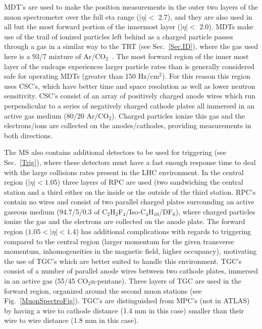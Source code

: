 \gls{MDT}'s are used to make the position measurements in the outer two layers of the muon spectrometer over the full eta range ($\mid\eta\mid<$ 2.7), and they are also used in all but the most forward portion of the innermost layer ($\mid\eta\mid<$ 2.0).  
MDTs make use of the trail of ionized particles left behind as a charged particle passes through a gas in a similar way to the TRT (see Sec.~\ref{Sec.ID}), where the gas used here is a 93/7 mixture of Ar/CO$_2$~\cite{JOIATLAS}.  
The most forward region of the inner most layer of the endcaps experiences larger particle rates than is generally considered safe for operating MDTs (greater than 150 Hz/cm$^2$).  
For this reason this region uses \gls{CSC}'s, which have better time and space resolution as well as lower neutron sensitivity.  
\gls{CSC}'s consist of an array of positively charged anode wires which run perpendicular to a series of negatively charged cathode plates all immersed in an active gas medium (80/20 Ar/CO$_2$).  
Charged particles ionize this gas and the electrons/ions are collected on the anodes/cathodes, providing measurements in both directions.  

The MS also contains additional detectors to be used for triggering (see Sec.~\ref{Trig}), where these detectors must have a fast enough response time to deal with the large collisions rates present in the LHC environment.  
In the central region ($\mid\eta\mid < 1.05$) three layers of \gls{RPC} are used (two sandwiching the central station and a third either on the inside or the outside of the third station.  
\gls{RPC}'s contain no wires and consist of two parallel charged plates surrounding an active gaseous medium (94.7/5/0.3 of C$_2$H$_2$F$_4$/Iso-C$_4$H$_10$/DF$_6$), where charged particles ionize the gas and the electrons are collected on the anode plate.   
The forward region ($1.05<\mid\eta\mid < 1.4$) has additional complications with regards to triggering compared to the central region (larger momentum for the given transverse momentum, inhomogeneities in the magnetic field, higher occupancy), motivating the use of \gls{TGC}'s which are better suited to handle this environment.  
\gls{TGC}'s consist of a number of parallel anode wires between two cathode plates, immersed in an active gas (55/45 CO$_2$n-pentane).  
Three layers of TGC are used in the forward region, organized around the second muon stations (see Fig.~\ref{MuonSpectroFig}).  
\gls{TGC}'s are distinguished from \gls{MPC}'s (not in ATLAS) by having a wire to cathode distance (1.4 mm in this case) smaller than their wire to wire distance (1.8 mm in this case).  

